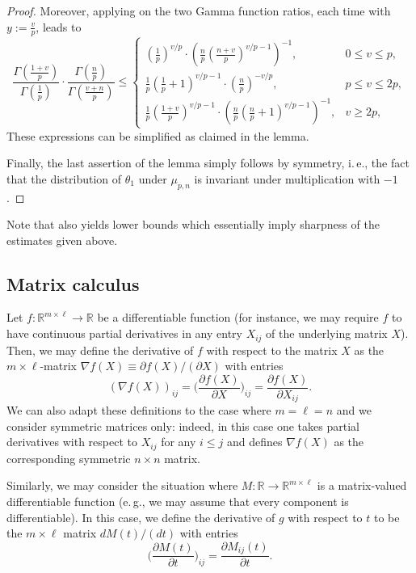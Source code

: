 \documentclass[a4paper,12pt]{amsart}
\numberwithin{equation}{section}
\theoremstyle{remark}
\def\R{{\mathbb R}}
\begin{document}
\begin{proof}
    Moreover, applying \cite[Th.\ 2]{Jam13} on the two Gamma function ratios, each time with $y := \frac{v}{p}$, leads to
    \[
    \frac{ \Gamma(\frac{1 + v}{p})} {\Gamma(\frac 1 p)} \cdot \frac{\Gamma(\frac{n} {p})} {\Gamma(\frac{v+n}{p})} \le \begin{cases} (\frac{1}{p})^{v/p} \cdot (\frac{n}{p}(\frac{n+v}{p})^{v/p-1})^{-1}, & 0\le v\le p,\\
    \frac{1}{p}(\frac{1}{p}+1)^{v/p-1} \cdot (\frac{n}{p})^{-v/p}, & p \le v \le 2p,\\
    \frac{1}{p}(\frac{1+v}{p})^{v/p-1} \cdot (\frac{n}{p}(\frac{n}{p}+1)^{v/p-1})^{-1}, & v \ge 2p,
    \end{cases}
    \]
    These expressions can be simplified as claimed in the lemma.

    Finally, the last assertion of the lemma simply follows by symmetry, i.\,e., the fact that the distribution of $\theta_1$ under $\mu_{p,n}$ is invariant under multiplication with $-1$.
\end{proof}

Note that \cite[Th.\ 2]{Jam13} also yields lower bounds which essentially imply sharpness of the estimates given above.

\subsection{Matrix calculus}\label{sec:MatCal}

Let $f \colon \R^{m\times \ell} \to \R$ be a differentiable function (for instance, we may require $f$ to have continuous partial derivatives in any entry $X_{ij}$ of the underlying matrix $X$). Then, we may define the derivative of $f$ with respect to the matrix $X$ as the $m \times \ell$-matrix $\nabla f(X) \equiv \partial f(X)/(\partial X)$ with entries
\[
(\nabla f(X))_{ij} = \Big(\frac{\partial f(X)}{\partial X}\Big)_{ij} = \frac{\partial f(X)}{\partial X_{ij}}.
\]
We can also adapt these definitions to the case where $m=\ell=n$ and we consider symmetric matrices only: indeed, in this case one takes partial derivatives with respect to $X_{ij}$ for any $i \le j$ and defines $\nabla f(X)$ as the corresponding symmetric $n \times n$ matrix.

Similarly, we may consider the situation where $M \colon \R \to \R^{m \times \ell}$ is a matrix-valued differentiable function (e.\,g., we may assume that every component is differentiable). In this case, we define the derivative of $g$ with respect to $t$ to be the $m \times \ell$ matrix $dM(t)/(dt)$ with entries
\[
\Big(\frac{\partial M(t)}{\partial t}\Big)_{ij} = \frac{\partial M_{ij}(t)}{\partial t}.
\]
\end{document}

